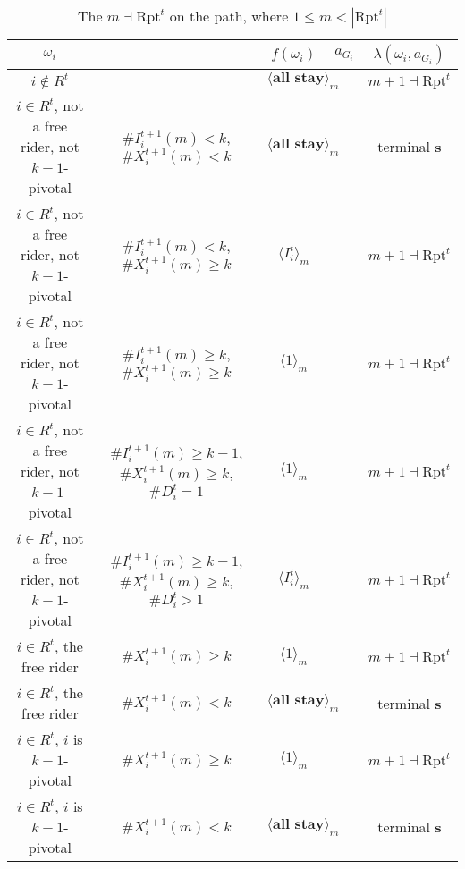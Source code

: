 \documentclass[12pt,letter]{article}
\newcommand{\Omicron}{\mathrm{Rpt}}
\theoremstyle{definition}
\theoremstyle{remark}
\theoremstyle{claim}
\begin{document}
\begin{landscape}
\begin{table}[!htbp]
\caption{The $m\dashv\Omicron^t$ on the path, where $1\leq m < |\Omicron^t|$}
\label{table:eqm_path_ot1}
\begin{center}
\begin{tabular}{c c | c | c | c}
$\omega_i$ 	 & 	   &	$f(\omega_i)$  &	$a_{G_i}$ & $\lambda(\omega_i,a_{G_i})$ \\
\hline
\hline
$i\notin R^t$  	& 								& $\langle \textbf{all stay} \rangle_m$		&  			& $m+1\dashv \Omicron^t$ \\
$i\in R^t$, not a free rider, not $k-1$-pivotal		 	&  $\#I^{t+1}_i(m)< k$, $\#X^{t+1}_i(m)<k$			&  $\langle \textbf{all stay} \rangle_m$	& 	& terminal \textbf{s} \\
$i\in R^t$, not a free rider, not $k-1$-pivotal	  	& $\#I^{t+1}_i(m)<k$, $\#X^{t+1}_i(m)\geq k$		    & $\langle I^t_i \rangle_m$ 		&    			& $m+1\dashv \Omicron^t$ \\
$i\in R^t$, not a free rider, not $k-1$-pivotal	 	&  $\#I^{t+1}_i(m)\geq k$, $\#X^{t+1}_i(m)\geq k$	& $\langle 1 \rangle_m$ 	& 	& $m+1\dashv \Omicron^t$ \\
$i\in R^t$, not a free rider, not $k-1$-pivotal	 	&  $\#I^{t+1}_i(m)\geq k-1$, $\#X^{t+1}_i(m)\geq k$, $\#D^t_i=1$	& $\langle 1 \rangle_m$ 	& 	& $m+1\dashv \Omicron^t$ \\
$i\in R^t$, not a free rider, not $k-1$-pivotal	 	&  $\#I^{t+1}_i(m)\geq k-1$, $\#X^{t+1}_i(m)\geq k$, $\#D^t_i>1$	& $\langle I^t_i \rangle_m$ 	& 	& $m+1\dashv \Omicron^t$ \\
$i\in R^t$, the free rider  	&  $\#X^{t+1}_i(m)\geq k$ & $\langle 1 \rangle_m$ 		& 				  & $m+1\dashv \Omicron^t$ \\
$i\in R^t$, the free rider  	&  		$\#X^{t+1}_i(m)<k$					&  $\langle \textbf{all stay} \rangle_m$		& 										  & terminal \textbf{s} \\
$i\in R^t$, $i$ is $k-1$-pivotal  	&  $\#X^{t+1}_i(m)\geq k$ & $\langle 1 \rangle_m$ 	& 											 & $m+1\dashv \Omicron^t$ \\
$i\in R^t$, $i$ is $k-1$-pivotal  	&  	$\#X^{t+1}_i(m)<k$		&  $\langle \textbf{all stay} \rangle_m$	& 											 & terminal \textbf{s} \\
\hline
\end{tabular}
\end{center}
\end{table}


\end{landscape}
\end{document}

